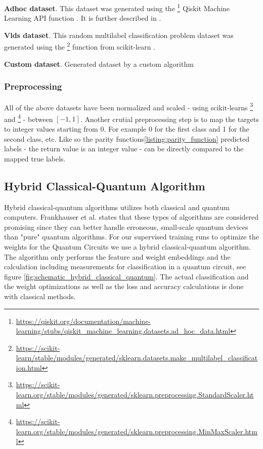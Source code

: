 \textbf{Adhoc dataset}. This dataset was generated using the \footnote{\url{https://qiskit.org/documentation/machine-learning/stubs/qiskit_machine_learning.datasets.ad_hoc_data.html}} Qiskit Machine Learning API function \cite{AdHocData}. It is further described in \cite{havlicekSupervisedLearningQuantum2019}.

\textbf{Vlds dataset}. This random multilabel classification problem dataset was generated using the \footnote{\url{https://scikit-learn/stable/modules/generated/sklearn.datasets.make_multilabel_classification.html}} function from scikit-learn\cite{scikit-learn} \cite{SklearnDatasetsMake}.

\textbf{Custom dataset}. Generated dataset by a custom algorithm 

\subsubsection{Preprocessing}
All of the above datasets have been normalized and scaled - using scikit-learns  \footnote{\url{https://scikit-learn.org/stable/modules/generated/sklearn.preprocessing.StandardScaler.html}} and \footnote{\url{https://scikit-learn.org/stable/modules/generated/sklearn.preprocessing.MinMaxScaler.html}} - between $[-1, 1]$. Another crutial preprocessing step is to map the targets to integer values starting from 0. For example 0 for the first class and 1 for the second class, etc. Like so the parity functions\ref{listing:parity_function} predicted labels - the return value is an integer value - can be directly compared to the mapped true labels.

\clearpage

\subsection{Hybrid Classical-Quantum Algorithm}
Hybrid classical-quantum algorithms utilizes both classical and quantum computers. Frankhauser et al. \cite{fankhauser_multiple_2021} states that these types of algorithms are considered promising since they can better handle erroneous, small-scale quantum devices than "pure" quantum algorithms.
For our supervised training runs to optimize the weights for the Quantum Circuits we use a hybrid classical-quantum algorithm. The algorithm only performs the feature and weight embeddings and the calculation including measurements for classification in a quantum circuit, see figure \ref{fig:schematic_hybrid_classical_quantum}. The actual classification and the weight optimizations as well as the loss and accuracy calculations is done with classical methods. 

